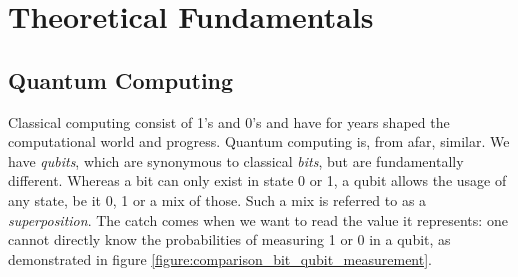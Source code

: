 \chapter{Theoretical Fundamentals} %

\label{chapter:theoretical_fundamentals} %

\def \blochwidth {0.4}
\def \qspherewidth {0.5}
\def \histogramwidth {0.4}
\newcommand{\bloch}{\emph{Bloch}-Sphere}
\newcommand{\qsphere}{Q-Sphere}
\newcommand{\hgate}{$\mathrm{H}$-Gate}

\newcommand{\xgate}{$\mathrm{X}$-Gate}
\newcommand{\ygate}{$\mathrm{Y}$-Gate}
\newcommand{\zgate}{$\mathrm{Z}$-Gate}

\newcommand{\rygate}{$\mathrm{RY}$-Gate}
\newcommand{\rxgate}{$\mathrm{RX}$-Gate}
\newcommand{\rzgate}{$\mathrm{RZ}$-Gate}

\newcommand{\crygate}{$\mathrm{CRY}$-Gate}
\newcommand{\crxgate}{$\mathrm{CRX}$-Gate}
\newcommand{\crzgate}{$\mathrm{CRZ}$-Gate}

\newcommand{\cxgate}{$\mathrm{CX}$-Gate}
\newcommand{\cygate}{$\mathrm{CY}$-Gate}
\newcommand{\czgate}{$\mathrm{CZ}$-Gate}

\newcommand{\frenchquotes}[1]{«~#1~»}

\section{Quantum Computing}
Classical computing consist of 1's and 0's and have for years shaped the computational world and progress. Quantum computing is, from afar, similar. We have \emph{qubits}, which are synonymous to classical \emph{bits}, but are fundamentally different. Whereas a bit can only exist in state 0 or 1, a qubit allows the usage of any state, be it 0, 1 or a mix of those. Such a mix is referred to as a \emph{superposition}\cite{gudder_superposition_1970}. The catch comes when we want to read the value it represents: one cannot directly know the probabilities of measuring 1 or 0 in a qubit, as demonstrated in figure \ref{figure:comparison_bit_qubit_measurement}.

